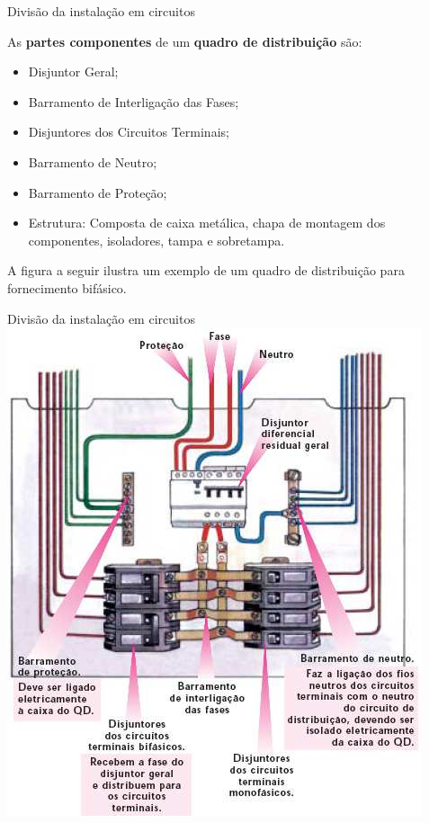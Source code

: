 \begin{frame}{Divisão da instalação em circuitos}
	\begin{block}{}
		As \textbf{partes componentes} de um \textbf{quadro de distribuição} são:
		\begin{itemize}
			\item Disjuntor Geral;
			\item Barramento de Interligação das Fases;
			\item Disjuntores dos Circuitos Terminais;
			\item Barramento de Neutro;
			\item Barramento de Proteção;
			\item Estrutura: Composta de caixa metálica, chapa de montagem dos componentes, isoladores, tampa e sobretampa.
		\end{itemize}

		A figura a seguir ilustra um exemplo de um quadro de distribuição para fornecimento bifásico.


	\end{block}

\end{frame}

\begin{frame}{Divisão da instalação em circuitos}
	\centering
	\includegraphics[width=0.55\linewidth]{Figuras/Ch05/fig6}
\end{frame}



